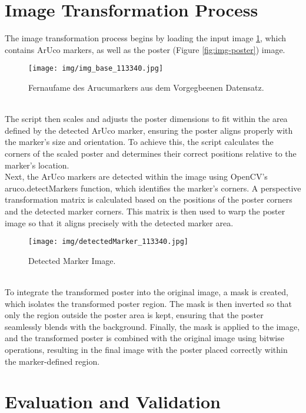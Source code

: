 \documentclass[a4paper,twocolumn]{article}
\begin{document}
\section{Image Transformation Process}
The image transformation process begins by loading the input image \ref{fig:example-base}, which contains ArUco markers, as well as the poster (Figure \ref{fig:img-poster}) image. 
\begin{figure}[h!]
    \centering
    \texttt{[image: img/img\_base\_113340.jpg]} %
    \caption{Fernaufame des Arucumarkers aus dem Vorgegbeenen Datensatz.\cite{stefan-elser}}
    \label{fig:example-base}
\end{figure}
\\
The script then scales and adjusts the poster dimensions to fit within the area defined by the detected ArUco marker, ensuring the poster aligns properly with the marker's size and orientation. To achieve this, the script calculates the corners of the scaled poster and determines their correct positions relative to the marker's location. 
\\
Next, the ArUco markers are detected within the image using OpenCV's aruco.detectMarkers function, which identifies the marker's corners. A perspective transformation matrix is calculated based on the positions of the poster corners and the detected marker corners. This matrix is then used to warp the poster image so that it aligns precisely with the detected marker area.
\begin{figure}[h!]
    \centering
    \texttt{[image: img/detectedMarker\_113340.jpg]} %
    \caption{Detected Marker Image.\cite{stefan-elser}}
    \label{fig:detected-marker}
\end{figure}
\\
To integrate the transformed poster into the original image, a mask is created, which isolates the transformed poster region. The mask is then inverted so that only the region outside the poster area is kept, ensuring that the poster seamlessly blends with the background. Finally, the mask is applied to the image, and the transformed poster is combined with the original image using bitwise operations, resulting in the final image with the poster placed correctly within the marker-defined region.

\section{Evaluation and Validation}
\end{document}
